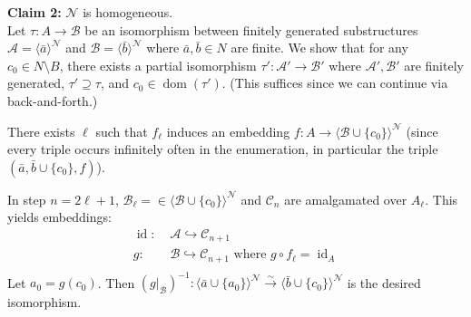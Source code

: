 \documentclass[
]{article}
\theoremstyle{definition}
\theoremstyle{definition}
\theoremstyle{plain}
\theoremstyle{remark}
\begin{document}
\textbf{Claim 2:} \(\mathcal{N}\) is homogeneous.\\
Let \(\tau: A \to \mathcal{B}\) be an isomorphism between finitely
generated substructures
\(\mathcal{A} = \langle \bar{a} \rangle^{\mathcal{N}}\) and
\(\mathcal{B} = \langle \bar{b} \rangle^{\mathcal{N}}\) where
\(\bar{a}, \bar{b} \in N\) are finite. We show that for any
\(c_0 \in N \setminus B\), there exists a partial isomorphism
\(\tau': \mathcal{A}' \to \mathcal{B}'\) where
\(\mathcal{A}', \mathcal{B}'\) are finitely generated,
\(\tau' \supseteq \tau\), and \(c_0 \in \operatorname{dom}(\tau')\).
(This suffices since we can continue via back-and-forth.)

There exists \(\ell\) such that \(f_\ell\) induces an embedding
\(f: A \to \langle \mathcal{B} \cup \{c_0\} \rangle^{\mathcal{N}}\)
(since every triple occurs infinitely often in the enumeration, in
particular the triple \((\bar{a}, \bar{b} \cup \{c_0\}, f)\)).

In step \(n = 2\ell + 1\),
\(\mathcal{B}_\ell =  \in \langle \mathcal{B} \cup \{c_0\} \rangle^{\mathcal{N}}\)
and \(\mathcal{C}_n\) are amalgamated over \(A_\ell\). This yields
embeddings: \[
\begin{aligned}
\operatorname{id}: & \;  \mathcal{A} \hookrightarrow \mathcal{C}_{n+1} \\
 g: & \; \mathcal{B} \hookrightarrow \mathcal{C}_{n+1}  \text{ where } g \circ f_\ell = \operatorname{id}_A \\
\end{aligned}
\] Let \(a_0 = g(c_0)\). Then
\((g|_{\mathcal{B}})^{-1}: \langle \bar{a} \cup \{a_0\} \rangle^{\mathcal{N}} \overset{\sim}{\to} \langle \bar{b} \cup \{c_0\} \rangle^{\mathcal{N}}\)
is the desired isomorphism.
\end{document}
